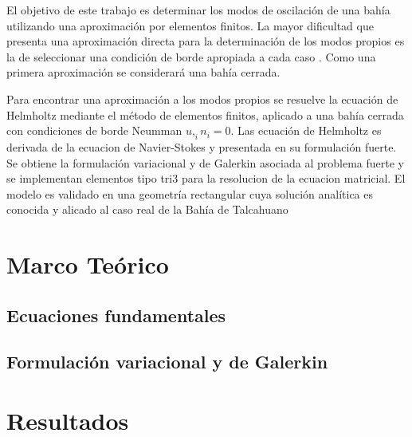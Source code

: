 \documentclass[12pt, letterpaper]{article}
\begin{document}
El objetivo de este trabajo es determinar los modos de oscilaci\'on de una bah\'ia utilizando una aproximaci\'on por elementos finitos. La mayor dificultad que presenta una aproximaci\'on directa para la determinaci\'on de los modos propios es la de seleccionar una condici\'on de borde apropiada a cada caso \cite{Mei2005, Rabino2009}. Como una primera aproximaci\'on se considerar\'a una bah\'ia cerrada.

Para encontrar una aproximaci\'on a los modos propios se resuelve la ecuaci\'on de Helmholtz mediante el m\'etodo de elementos finitos, aplicado a una bah\'ia cerrada con condiciones de borde Neumman $u,_i  n_i = 0$. Las ecuaci\'on de Helmholtz es derivada de la ecuacion de Navier-Stokes y presentada en su formulaci\'on fuerte. Se obtiene la formulaci\'on variacional y de Galerkin asociada al problema fuerte y se implementan elementos tipo tri3 para la resolucion de la ecuacion matricial. El modelo es validado en una geometr\'ia rectangular cuya soluci\'on anal\'itica es conocida y alicado al caso real de la Bah\'ia de Talcahuano


\section{Marco Te\'orico}
  \subsection{Ecuaciones fundamentales}
  \label{subsec:ecuaciones}
  
  \subsection{Formulaci\'on variacional y de Galerkin}
  
\section{Resultados}
  
  
%   
\end{document}

